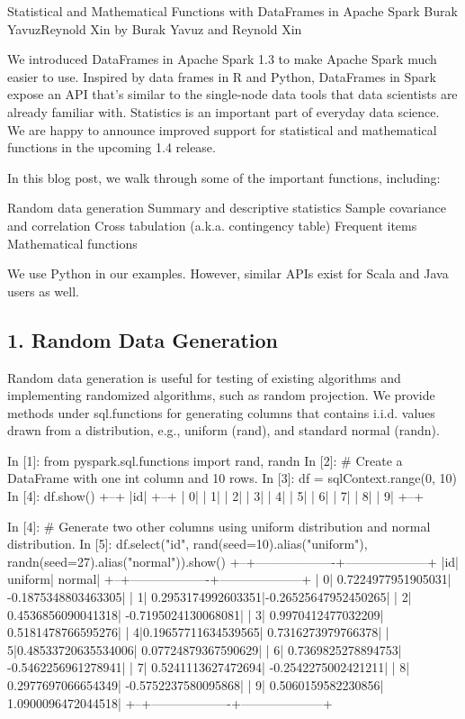 
Statistical and Mathematical Functions with DataFrames in Apache Spark
Burak YavuzReynold Xin by Burak Yavuz and Reynold Xin 

We introduced DataFrames in Apache Spark 1.3 to make Apache Spark much easier to use. Inspired by data frames in R and Python, DataFrames in Spark expose an API that’s similar to the single-node data tools that data scientists are already familiar with. Statistics is an important part of everyday data science. We are happy to announce improved support for statistical and mathematical functions in the upcoming 1.4 release.

In this blog post, we walk through some of the important functions, including:

Random data generation
Summary and descriptive statistics
Sample covariance and correlation
Cross tabulation (a.k.a. contingency table)
Frequent items
Mathematical functions

We use Python in our examples. However, similar APIs exist for Scala and Java users as well.

\subsection*{1. Random Data Generation}
Random data generation is useful for testing of existing algorithms and implementing randomized algorithms, such as random projection. We provide methods under sql.functions for generating columns that contains i.i.d. values drawn from a distribution, e.g., uniform (rand),  and standard normal (randn).

In [1]: from pyspark.sql.functions import rand, randn
In [2]: # Create a DataFrame with one int column and 10 rows.
In [3]: df = sqlContext.range(0, 10)
In [4]: df.show()
+--+
|id|
+--+
| 0|
| 1|
| 2|
| 3|
| 4|
| 5|
| 6|
| 7|
| 8|
| 9|
+--+

In [4]: # Generate two other columns using uniform distribution and normal distribution.
In [5]: df.select("id", rand(seed=10).alias("uniform"), randn(seed=27).alias("normal")).show()
+--+-------------------+--------------------+
|id|            uniform|              normal|
+--+-------------------+--------------------+
| 0| 0.7224977951905031| -0.1875348803463305|
| 1| 0.2953174992603351|-0.26525647952450265|
| 2| 0.4536856090041318| -0.7195024130068081|
| 3| 0.9970412477032209|  0.5181478766595276|
| 4|0.19657711634539565|  0.7316273979766378|
| 5|0.48533720635534006| 0.07724879367590629|
| 6| 0.7369825278894753| -0.5462256961278941|
| 7| 0.5241113627472694| -0.2542275002421211|
| 8| 0.2977697066654349| -0.5752237580095868|
| 9| 0.5060159582230856|  1.0900096472044518|
+--+-------------------+--------------------+

